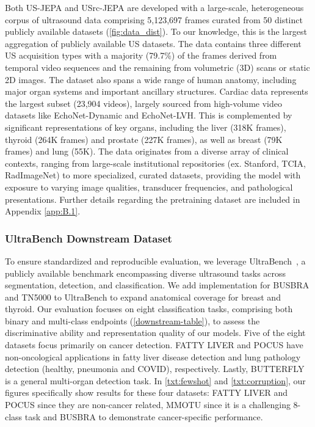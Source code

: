 \documentclass{article}
\theoremstyle{plain}
\theoremstyle{definition}
\theoremstyle{remark}
\begin{document}
Both US-JEPA and USrc-JEPA are developed with a large-scale, heterogeneous corpus of ultrasound data comprising 5,123,697 frames curated from 50 distinct publicly available datasets (\cref{fig:data_dist}). To our knowledge, this is the largest aggregation of publicly available US datasets. The data contains three different US acquisition types with a majority (79.7\%) of the frames derived from temporal video sequences and the remaining from volumetric (3D) scans or static 2D images. The dataset also spans a wide range of human anatomy, including major organ systems and important ancillary structures. Cardiac data represents the largest subset (23,904 videos), largely sourced from high-volume video datasets like EchoNet-Dynamic and EchoNet-LVH. This is complemented by significant representations of key organs, including the liver (318K frames), thyroid (264K frames) and prostate (227K frames), as well as breast (79K frames) and lung (55K). The data originates from a diverse array of clinical contexts, ranging from large-scale institutional repositories (ex. Stanford, TCIA, RadImageNet) to more specialized, curated datasets, providing the model with exposure to varying image qualities, transducer frequencies, and pathological presentations. Further details regarding the pretraining dataset are included in Appendix \cref{app:B.1}.

\subsubsection{UltraBench Downstream Dataset}

To ensure standardized and reproducible evaluation, we leverage UltraBench~\cite{tupper_revisiting_nodate}, a publicly available benchmark encompassing diverse ultrasound tasks across segmentation, detection, and classification. We add implementation for BUSBRA and TN5000 to UltraBench to expand anatomical coverage for breast and thyroid. Our evaluation focuses on eight classification tasks, comprising both binary and multi-class endpoints (\cref{downstream-table}), to assess the discriminative ability and representation quality of our models. Five of the eight datasets focus primarily on cancer detection. FATTY LIVER and POCUS have non-oncological applications in fatty liver disease detection and lung pathology detection (healthy, pneumonia and COVID), respectively. Lastly, BUTTERFLY is a general multi-organ detection task. In \cref{txt:fewshot} and \cref{txt:corruption}, our figures specifically show results for these four datasets: FATTY LIVER and POCUS since they are non-cancer related, MMOTU since it is a challenging 8-class task and BUSBRA to demonstrate cancer-specific performance.
\end{document}
